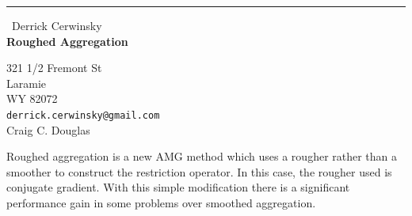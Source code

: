 \documentclass{report}
\begin{document}
\begin{center}
\rule{6in}{1pt} \
{\large Derrick Cerwinsky \\
{\bf Roughed Aggregation}}

321 1/2 Fremont St \\ Laramie \\ WY 82072
\\
{\tt derrick.cerwinsky@gmail.com}\\
Craig C. Douglas\end{center}

Roughed aggregation is a new AMG method which uses a rougher rather than
a smoother to construct the restriction operator.
In this case, the rougher used is conjugate gradient.
With this simple modification there is a significant performance
gain in some problems over smoothed aggregation.
\end{document}
